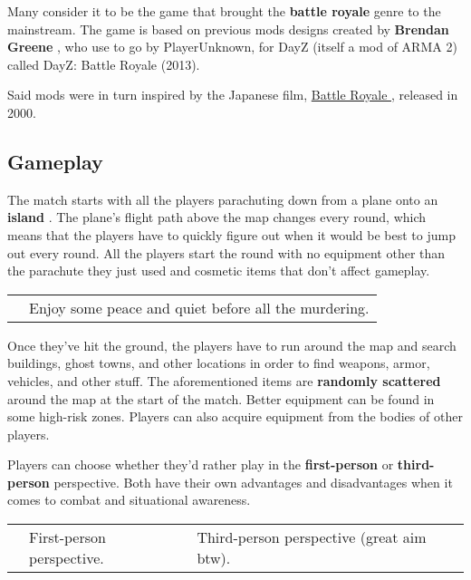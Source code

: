 \documentclass[a4paper,10pt]{book}
\begin{document}
      Many consider it to be the game that brought the  \textbf{battle royale }  genre to the mainstream. The game is based on previous mods designs created by  \textbf{Brendan Greene } , who use to go by PlayerUnknown, for DayZ (itself a mod of ARMA 2) called DayZ: Battle Royale (2013).
   
    Said mods were in turn inspired by the Japanese film,  \href{https://en.wikipedia.org/wiki/Battle_Royale_(film)}{Battle Royale }, released in 2000.
   
 
 \subsection{Gameplay }
 
        The match starts with all the players parachuting down from a plane onto an  \textbf{island } .
        The plane's flight path above the map changes every round, which means that the players have to quickly figure out when it would be best to jump out every round.
        All the players start the round with no equipment other than the parachute they just used and cosmetic items that don't affect gameplay.
       
 \begin{longtable}{p{1mm}|l|}\hline
 
 & 
 \\\hline
 
 & Enjoy some peace and quiet before all the murdering. 
 \\\hline
 \end{longtable}
 
        Once they've hit the ground, the players have to run around the map and search buildings, ghost towns, and other locations in order to find weapons, armor, vehicles, and other stuff.
        The aforementioned items are  \textbf{randomly scattered }  around the map at the start of the match. Better equipment can be found in some high-risk zones.
         Players can also acquire equipment from the bodies of other players.
       
 
        Players can choose whether they'd rather play in the  \textbf{first-person }  or  \textbf{third-person }  perspective.
        Both have their own advantages and disadvantages when it comes to combat and situational awareness.
       
 \begin{longtable}{p{1mm}|l|l|}\hline
 
 & 
 & 
 \\\hline
 
 & First-person perspective. 
 & Third-person perspective (great aim btw). 
 \\\hline
 \end{longtable}
 
\end{document}
